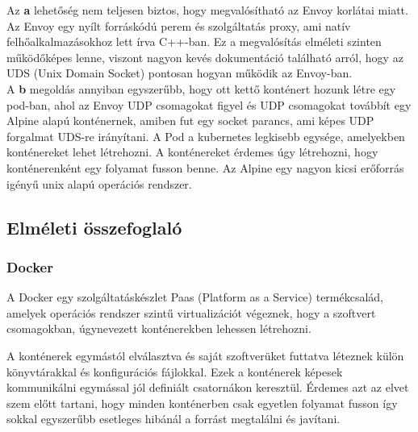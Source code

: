 \documentclass[a4paper,oneside]{article}
\begin{document}
Az \textbf{a} lehetőség nem teljesen biztos, hogy megvalósítható az Envoy korlátai 
miatt. Az Envoy egy nyílt forráskódú perem és szolgáltatás proxy, ami natív felhőalkalmazásokhoz 
lett írva C++-ban. Ez a megvalósítás elméleti szinten működőképes lenne, 
viszont nagyon kevés dokumentáció található arról, hogy az UDS (Unix Domain Socket) 
pontosan hogyan működik az Envoy-ban. \\
A \textbf{b} megoldás annyiban egyszerűbb, hogy ott kettő konténert hozunk létre egy pod-ban, ahol 
az Envoy UDP csomagokat figyel és UDP csomagokat továbbít egy Alpine alapú konténernek, amiben fut egy 
socket parancs, ami képes UDP forgalmat UDS-re irányítani. A Pod a kubernetes legkisebb egysége, 
amelyekben konténereket lehet létrehozni. A konténereket érdemes úgy létrehozni, hogy 
konténerenként egy folyamat fusson benne. Az Alpine egy nagyon kicsi erőforrás igényű unix alapú 
operációs rendszer. 


\subsection{Elméleti összefoglaló}
\subsubsection{Docker}
A Docker egy szolgáltatáskészlet Paas (Platform as a Service) termékcsalád, 
amelyek operációs rendszer szintű virtualizációt végeznek, hogy a szoftvert 
csomagokban, úgynevezett konténerekben lehessen létrehozni. 

A konténerek egymástól elválasztva és saját szoftverüket futtatva léteznek 
külön könyvtárakkal és konfigurációs fájlokkal. Ezek a konténerek képesek 
kommunikálni egymással jól definiált csatornákon keresztül. Érdemes azt az 
elvet szem előtt tartani, hogy minden konténerben csak egyetlen folyamat fusson 
így sokkal egyszerűbb esetleges hibánál a forrást megtalálni és javítani. 
\end{document}

